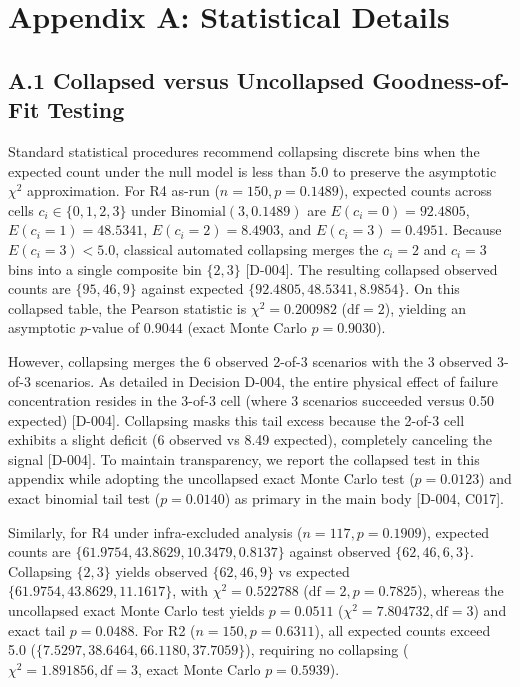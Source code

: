 \documentclass[11pt,letterpaper]{article}
\begin{document}
\section*{Appendix A: Statistical Details}

\subsection*{A.1 Collapsed versus Uncollapsed Goodness-of-Fit Testing}
Standard statistical procedures recommend collapsing discrete bins when the expected count under the null model is less than 5.0 to preserve the asymptotic $\chi^2$ approximation. For R4 as-run ($n=150, p=0.1489$), expected counts across cells $c_i \in \{0, 1, 2, 3\}$ under $\text{Binomial}(3, 0.1489)$ are $E(c_i = 0) = 92.4805$, $E(c_i = 1) = 48.5341$, $E(c_i = 2) = 8.4903$, and $E(c_i = 3) = 0.4951$. Because $E(c_i = 3) < 5.0$, classical automated collapsing merges the $c_i = 2$ and $c_i = 3$ bins into a single composite bin $\{2, 3\}$ [D-004]. The resulting collapsed observed counts are $\{95, 46, 9\}$ against expected $\{92.4805, 48.5341, 8.9854\}$. On this collapsed table, the Pearson statistic is $\chi^2 = 0.200982$ ($\text{df} = 2$), yielding an asymptotic $p$-value of $0.9044$ (exact Monte Carlo $p = 0.9030$).

However, collapsing merges the 6 observed 2-of-3 scenarios with the 3 observed 3-of-3 scenarios. As detailed in Decision D-004, the entire physical effect of failure concentration resides in the 3-of-3 cell (where 3 scenarios succeeded versus 0.50 expected) [D-004]. Collapsing masks this tail excess because the 2-of-3 cell exhibits a slight deficit (6 observed vs 8.49 expected), completely canceling the signal [D-004]. To maintain transparency, we report the collapsed test in this appendix while adopting the uncollapsed exact Monte Carlo test ($p = 0.0123$) and exact binomial tail test ($p = 0.0140$) as primary in the main body [D-004, C017].

Similarly, for R4 under infra-excluded analysis ($n=117, p=0.1909$), expected counts are $\{61.9754, 43.8629, 10.3479, 0.8137\}$ against observed $\{62, 46, 6, 3\}$. Collapsing $\{2, 3\}$ yields observed $\{62, 46, 9\}$ vs expected $\{61.9754, 43.8629, 11.1617\}$, with $\chi^2 = 0.522788$ ($\text{df}=2, p=0.7825$), whereas the uncollapsed exact Monte Carlo test yields $p = 0.0511$ ($\chi^2 = 7.804732, \text{df}=3$) and exact tail $p = 0.0488$. For R2 ($n=150, p=0.6311$), all expected counts exceed 5.0 ($\{7.5297, 38.6464, 66.1180, 37.7059\}$), requiring no collapsing ($\chi^2 = 1.891856, \text{df}=3$, exact Monte Carlo $p = 0.5939$).
\end{document}
